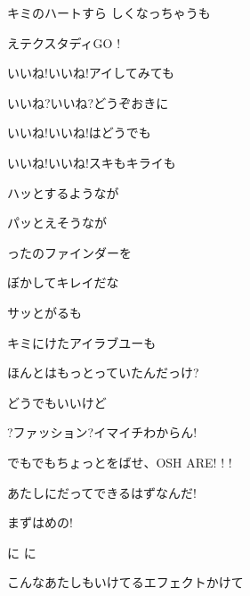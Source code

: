 \documentclass[a4paper,tate,twocolumn,12pt]{ltjtarticle}
\begin{document}
\begin{flushleft}
\begin{minipage}{\linewidth}
キミのハートすら しくなっちゃうも

えテクスタディGO !
\end{minipage}

\vspace{2em}

\noindent\begin{minipage}{\linewidth}
いいね!いいね!アイしてみても

いいね?いいね?どうぞおきに

いいね!いいね!はどうでも

いいね!いいね!スキもキライも
\end{minipage}

\vspace{2em}

\noindent\begin{minipage}{\linewidth}
ハッとするようなが

パッとえそうなが

ったのファインダーを

ぼかしてキレイだな
\end{minipage}

\vspace{2em}

\noindent\begin{minipage}{\linewidth}
サッとがるも

キミにけたアイラブユーも

ほんとはもっとっていたんだっけ?

どうでもいいけど
\end{minipage}

\vspace{2em}

\noindent\begin{minipage}{\linewidth}
?ファッション?イマイチわからん!

でもでもちょっとをばせ、OSH ARE! ! !

あたしにだってできるはずなんだ!

まずはめの!

に に

こんなあたしもいけてるエフェクトかけて


\end{minipage}
\end{flushleft}
\end{document}
